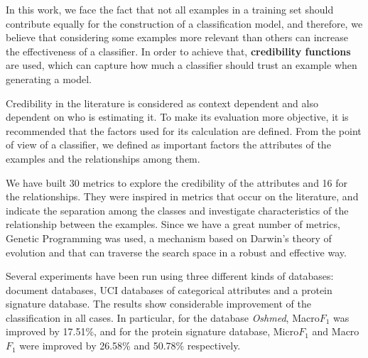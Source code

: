 In this work, we face the fact that not all examples in a training set should
contribute equally for the construction of a classification model, and
therefore, we believe that considering some examples more relevant than others
can increase the effectiveness of a classifier.
In order to achieve that, \textbf{credibility functions} are used, which can
capture how much a classifier should trust an example when generating a model.

Credibility in the literature is considered as context dependent and also dependent on who is estimating it.
To make its evaluation more objective, it is recommended that the factors used
for its calculation are defined. 
From the point of view of a classifier, we defined as important factors the
attributes of the examples and the relationships among them.

We have built 30 metrics to explore the credibility of the attributes and 16 for
the relationships. They were inspired in metrics that occur on the literature,
and indicate the separation among the classes and investigate characteristics
of the relationship between the examples. Since we have a great number of
metrics, Genetic Programming was used, a mechanism based on Darwin's theory of
evolution and that can traverse the search space in a robust and effective way.

Several experiments have been run using three different kinds of databases: document databases, \textsc{UCI} databases of categorical attributes and a protein signature database.
The results show
considerable improvement of the classification in all cases. In particular, for
the database \textit{Oshmed}, Macro$F_1$ was improved by 17.51\%, and for the
protein signature database, Micro$F_1$ and Macro$F_1$ were improved by 26.58\%
and 50.78\% respectively.

